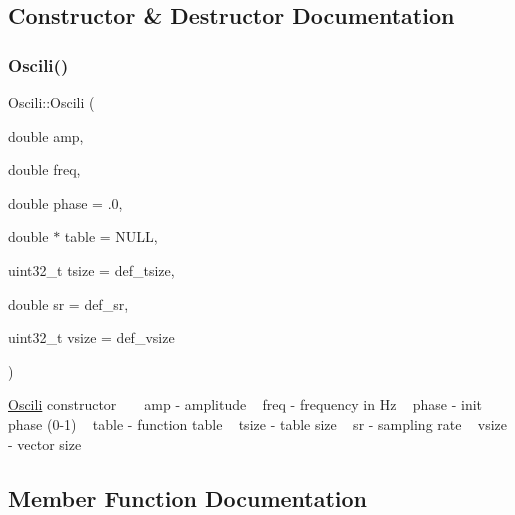 \subsection{Constructor \& Destructor Documentation}
\mbox{\label{class_oscili_a67e6c220007c24a72456680645c0bfa0}} 
\subsubsection{\texorpdfstring{Oscili()}{Oscili()}}
{\footnotesize\ttfamily Oscili\+::\+Oscili (\begin{DoxyParamCaption}\item[{double}]{amp,  }\item[{double}]{freq,  }\item[{double}]{phase = {\ttfamily .0},  }\item[{double $\ast$}]{table = {\ttfamily NULL},  }\item[{uint32\+\_\+t}]{tsize = {\ttfamily def\+\_\+tsize},  }\item[{double}]{sr = {\ttfamily def\+\_\+sr},  }\item[{uint32\+\_\+t}]{vsize = {\ttfamily def\+\_\+vsize} }\end{DoxyParamCaption})\hspace{0.3cm}{\ttfamily [inline]}}

\hyperlink{class_oscili}{Oscili} constructor ~\newline
~\newline
amp -\/ amplitude ~\newline
freq -\/ frequency in Hz ~\newline
phase -\/ init phase (0-\/1) ~\newline
 table -\/ function table ~\newline
tsize -\/ table size ~\newline
sr -\/ sampling rate ~\newline
vsize -\/ vector size ~\newline


\subsection{Member Function Documentation}
\mbox{\label{class_oscili_a2571464f3b4874c3ca691061e8db7d32}} 
